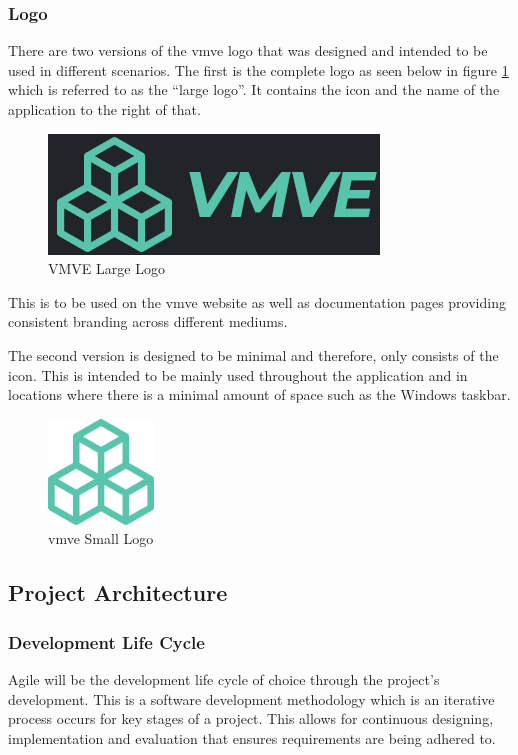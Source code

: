 \documentclass[11pt]{article}
\begin{document}
\subsubsection{Logo}
There are two versions of the \gls*{vmve} logo that was designed and intended to
be used in different scenarios. The first is the complete logo as seen below in
figure \ref{fig:project_logo_large} which is referred to as the ``large logo''.
It contains the icon and the name of the application to the right of that.
\begin{figure}[H]
  \centering
  \includegraphics[width=\textwidth]{images/project_logo.png}
  \caption{VMVE Large Logo}
  \label{fig:project_logo_large}
\end{figure}
This is to be used on the \gls*{vmve} website as well as documentation pages
providing consistent branding across different mediums.

The second version is designed to be minimal and therefore, only consists of the
icon. This is intended to be mainly used throughout the application and in
locations where there is a minimal amount of space such as the Windows taskbar.
\begin{figure}[H]
  \centering
  \includegraphics[width=0.25\textwidth]{images/project_icon.png}
  \caption{\gls*{vmve} Small Logo}
  \label{fig:project_logo_small}
\end{figure}


\subsection{Project Architecture}

\subsubsection{Development Life Cycle}
Agile will be the development life cycle of choice through the project's
development. This is a software development methodology which is an iterative
process occurs for key stages of a project. This allows for continuous
designing, implementation and evaluation that ensures requirements are being
adhered to.
\end{document}
